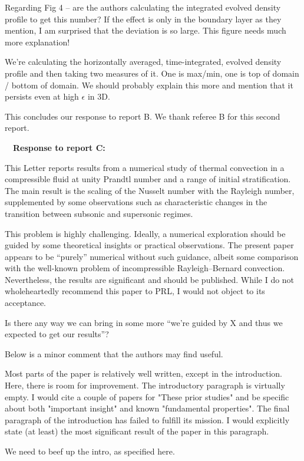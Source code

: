 \documentclass[aps, 11pt, singlecolumn]{revtex4-1} %
\begin{document}
\begin{singlespace}
\begin{myquotation}
Regarding Fig 4 -- are the authors calculating the integrated evolved
density profile to get this number? If the effect is only in the
boundary layer as they mention, I am surprised that the deviation is
so large. This figure needs much more explanation!
\end{myquotation}
We're calculating the horizontally averaged, time-integrated, evolved density
profile and then taking two measures of it.  One is max/min, one is top of domain
/ bottom of domain.  We should probably explain this more and mention that it persists
even at high $\epsilon$ in 3D.

\noindent
This concludes our response to report B.  We thank referee B for this second report.




$\,$
\newline
$\,$
\newline
\noindent
\Large{\textbf{Response to report C:}}\newline$\,$\newline\indent

\begin{myquotation}
This Letter reports results from a numerical study of thermal
convection in a compressible fluid at unity Prandtl number and a range
of initial stratification. The main result is the scaling of the
Nusselt number with the Rayleigh number, supplemented by some
observations such as characteristic changes in the transition between
subsonic and supersonic regimes.

This problem is highly challenging. Ideally, a numerical exploration
should be guided by some theoretical insights or practical
observations. The present paper appears to be ``purely'' numerical
without such guidance, albeit some comparison with the well-known
problem of incompressible Rayleigh--Bernard convection. Nevertheless,
the results are significant and should be published. While I do not
wholeheartedly recommend this paper to PRL, I would not object to its
acceptance.
\end{myquotation}
Is there any way we can bring in some more ``we're guided by X and thus
we expected to get our results''?

\begin{myquotation}
Below is a minor comment that the authors may find useful.

Most parts of the paper is relatively well written, except in the
introduction. Here, there is room for improvement. The introductory
paragraph is virtually empty. I would cite a couple of papers for
"These prior studies" and be specific about both "important insight"
and known "fundamental properties". The final paragraph of the
introduction has failed to fulfill its mission. I would explicitly
state (at least) the most significant result of the paper in this
paragraph.
\end{myquotation}
We need to beef up the intro, as specified here.


\end{singlespace}
\end{document}
